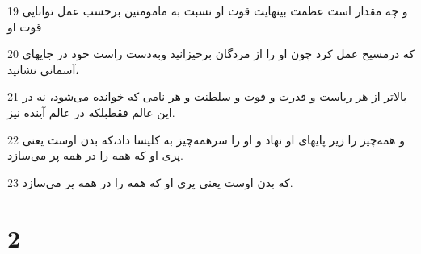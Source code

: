 \par 19 و چه مقدار است عظمت بینهایت قوت او نسبت به مامومنین برحسب عمل توانایی قوت او
\par 20 که درمسیح عمل کرد چون او را از مردگان برخیزانید وبه‌دست راست خود در جایهای آسمانی نشانید،
\par 21 بالاتر از هر ریاست و قدرت و قوت و سلطنت و هر نامی که خوانده می‌شود، نه در این عالم فقطبلکه در عالم آینده نیز.
\par 22 و همه‌چیز را زیر پایهای او نهاد و او را سرهمه‌چیز به کلیسا داد،که بدن اوست یعنی پری او که همه را در همه پر می‌سازد.
\par 23 که بدن اوست یعنی پری او که همه را در همه پر می‌سازد.

\chapter{2}

